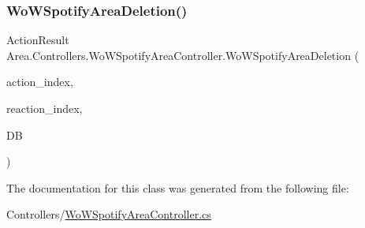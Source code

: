 \mbox{\label{classArea_1_1Controllers_1_1WoWSpotifyAreaController_aa0983209b4870cecb8bd9e2d6c4c34f0}} 
\subsubsection{\texorpdfstring{Wo\+W\+Spotify\+Area\+Deletion()}{WoWSpotifyAreaDeletion()}}
{\footnotesize\ttfamily Action\+Result Area.\+Controllers.\+Wo\+W\+Spotify\+Area\+Controller.\+Wo\+W\+Spotify\+Area\+Deletion (\begin{DoxyParamCaption}\item[{string}]{action\+\_\+index,  }\item[{string}]{reaction\+\_\+index,  }\item[{\mbox{[}\+From\+Services\mbox{]} \mbox{\hyperlink{classArea_1_1DAT_1_1AreaDbContext}{Area\+Db\+Context}}}]{DB }\end{DoxyParamCaption})\hspace{0.3cm}{\ttfamily [inline]}}



The documentation for this class was generated from the following file\+:\begin{DoxyCompactItemize}
\item 
Controllers/\mbox{\hyperlink{WoWSpotifyAreaController_8cs}{Wo\+W\+Spotify\+Area\+Controller.\+cs}}\end{DoxyCompactItemize}
